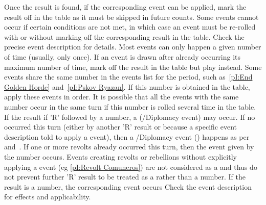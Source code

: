 \aparag Once the result is found, if the corresponding event can be
applied, mark the result off in the table as it must be skipped in
future counts.
\bparag Some events cannot occur if certain conditions are not met, in
which case an event must be re-rolled with or without marking off the
corresponding result in the table. Check the precise event description
for details.
\bparag Most events can only happen a given number of time (usually,
only once). If an event is drawn after already occurring its maximum
number of time, mark off the result in the table but play \RD instead.
\bparag Some events share the same number in the events list for the
period, such as~\ref{pI:End Golden Horde} and~\ref{pI:Pskov Ryazan}. If
this number is obtained in the table, apply these events in order. It is
possible that all the events with the same number occur in the same turn
if this number is rolled several time in the table.
\aparag[Revolts] If the result if 'R' followed by a number, a \RD
(\REVOLT/Diplomacy event) may occur.
\bparag If no \RD occurred this turn (either by another 'R' result or
because a specific event description told to apply a \RD event), then a
\REVOLT/Diplomacy event (\RD) happens as per~
and~.
\bparag If one or more revolts already occurred this turn, then the
event given by the number occurs.
\bparag Events creating revolts or rebellions without explicitly
applying a \RD event (eg \ref{pI:Revolt Comuneros}) are not considered
as a \RD and thus do not prevent further 'R' result to be treated as a
\RD rather than a number.
\aparag If the result is a number, the corresponding event occurs
\bparag Check the event description for effects and applicability.

